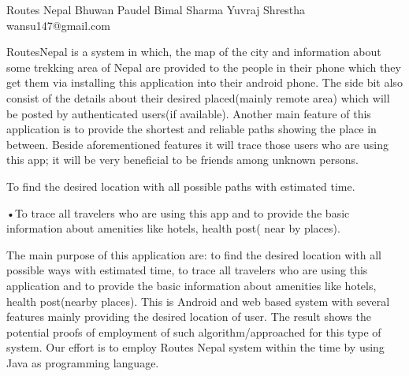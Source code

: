  \begin{conf-abstract}[]
 {Routes Nepal}
 {Bhuwan Paudel
 	Bimal Sharma
 	Yuvraj Shrestha
 }
{wansu147@gmail.com}

RoutesNepal is a system in which, the map of the city and information about some trekking area of Nepal are provided to the people in their phone which they get them via installing this application into their android phone. The side bit also consist of the details about their desired placed(mainly remote area) which will be posted by authenticated users(if available). Another main feature of this application is to provide the shortest and reliable paths showing the place in between. Beside aforementioned features it will trace those users who are using this app; it will be very beneficial to be friends among unknown persons. 

To find the desired location with all possible paths with estimated time. 

•To trace all travelers who are using this app and to provide the basic information about amenities like hotels, health post( near by places).

The main purpose of this application are: to find the desired location with all possible ways with estimated time, to trace all travelers who are using this application and to provide the basic information about amenities like hotels, health post(nearby places). This is Android and web based system with several features mainly providing the desired location of user. The result shows the potential proofs of employment of such algorithm/approached for this type of system. Our effort is to employ Routes Nepal system within the time by using Java as programming language.
 \end{conf-abstract}